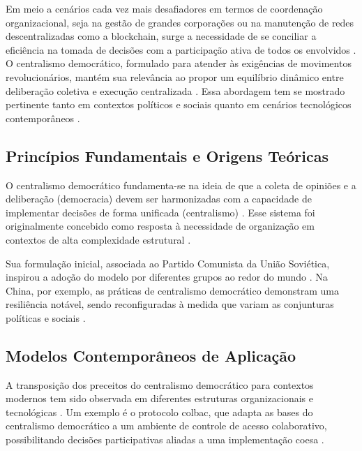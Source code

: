 Em meio a cenários cada vez mais desafiadores em termos de coordenação
organizacional, seja na gestão de grandes corporações ou na manutenção
de redes descentralizadas como a blockchain, surge a necessidade de se
conciliar a eficiência na tomada de decisões com a participação ativa
de todos os envolvidos \cite{DoArtifactsHavePolitics}.
O centralismo democrático, formulado para
atender às exigências de movimentos revolucionários, mantém sua
relevância ao propor um equilíbrio dinâmico entre deliberação coletiva
e execução centralizada \cite{EstatutosDoPCP}. Essa abordagem tem se mostrado pertinente
tanto em contextos políticos e sociais quanto em cenários tecnológicos
contemporâneos \cite{Colbac}.

\subsection{Princípios Fundamentais e Origens Teóricas}
\label{sec:principios_origens_teoricas}

O centralismo democrático fundamenta-se na ideia de que a coleta de
opiniões e a deliberação (democracia) devem ser harmonizadas com a
capacidade de implementar decisões de forma unificada (centralismo)
\cite{ACenturyofDemocraticCentralism}.
Esse sistema foi originalmente concebido como resposta à necessidade
de organização em contextos de alta complexidade estrutural 
\cite{StillaCenturyoftheChineseModel,EstatutosDoPCP}.

Sua formulação inicial, associada ao Partido Comunista da União
Soviética, inspirou a adoção do modelo por diferentes grupos ao redor
do mundo \cite{EstatutosDoPCP}. Na China, por exemplo, as práticas de centralismo
democrático demonstram uma resiliência notável, sendo reconfiguradas à
medida que variam as conjunturas políticas e sociais
\cite{ACenturyofDemocraticCentralism}.

\subsection{Modelos Contemporâneos de Aplicação}
\label{sec:modelos_contemporaneos}

A transposição dos preceitos do centralismo democrático para contextos
modernos tem sido observada em diferentes estruturas organizacionais e
tecnológicas \cite{DoArtifactsHavePolitics, Colbac}.
Um exemplo é o protocolo \gls{colbac}, que adapta as bases do
centralismo democrático a um ambiente de controle de acesso
colaborativo, possibilitando decisões participativas aliadas a uma
implementação coesa \cite{Colbac}.

